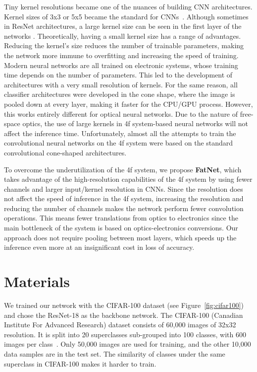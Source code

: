 \documentclass{article}
\begin{document}
Tiny kernel resolutions became one of the nuances of building CNN architectures. Kernel sizes of 3x3 or 5x5 became the standard for CNNs~\cite{krizhevsky_imagenet_2017}. Although sometimes in ResNet architectures, a large kernel size can be seen in the first layer of the networks  \cite{he_deep_2016}. Theoretically, having a small kernel size has a range of advantages. Reducing the kernel's size reduces the number of trainable parameters, making the network more immune to overfitting and increasing the speed of training. Modern neural networks are all trained on electronic systems, whose training time depends on the number of parameters. This led to the development of architectures with a very small resolution of kernels.
For the same reason, all classifier architectures were developed in the cone shape, where the image is pooled down at every layer, making it faster for the CPU/GPU process. However, this works entirely different for optical neural networks. Due to the nature of free-space optics, the use of large kernels in 4f system-based neural networks will not affect the inference time. Unfortunately, almost all the attempts to train the convolutional neural networks on the 4f system were based on the standard convolutional cone-shaped architectures. 

To overcome the underutilization of the 4f system, we propose {\bf FatNet}, which takes advantage of the high-resolution capabilities of the 4f system by using fewer channels and larger input/kernel resolution in CNNs. Since the resolution does not affect the speed of inference in the 4f system, increasing the resolution and reducing the number of channels makes the network perform fewer convolution operations. This means fewer translations from optics to electronics since the main bottleneck of the system is based on optics-electronics conversions. Our approach does not require pooling between most layers, which speeds up the inference even more at an insignificant cost in loss of accuracy.



\section{Materials}
We trained our network with the CIFAR-100 dataset (see Figure~\ref{fig:cifar100}) and chose the ResNet-18 as the backbone network.
The CIFAR-100 (Canadian Institute For Advanced Research) dataset consists of 60,000 images of 32x32 resolution. It is split into 20 superclasses sub-grouped into 100 classes, with 600 images per class~\cite{krizhevsky_learning_2009}. Only 50,000 images are used for training, and the other 10,000 data samples are in the test set. The similarity of classes under the same superclass in CIFAR-100 makes it harder to train. 
\end{document}
